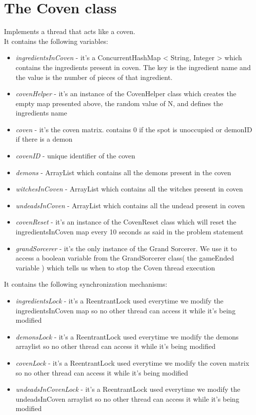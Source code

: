 \documentclass[14pt]{article}
\begin{document}
\section*{The Coven class}
\vspace{5 mm}
Implements a thread that acts like a coven.\\
It contains the following variables:\\ 
\begin{itemize}
            \item \textit{ingredientsInCoven} - it's a ConcurrentHashMap < String, Integer >  which contains the ingredients present in coven. The key is the ingredient name and the value is the number of pieces of that ingredient.
            \item \textit{covenHelper} - it's an instance of the CovenHelper class which creates the empty map presented above, the random value of N, and defines the ingredients name
            \item \textit{coven} - it's the coven matrix. contains 0 if the spot is unoccupied or demonID if there is a demon
            \item \textit{covenID} - unique identifier of the coven
            \item \textit{demons} - ArrayList which contains all the demons present in the coven
            \item \textit{witchesInCoven} - ArrayList which contains all the witches present in coven
            \item \textit{undeadsInCoven} - ArrayList which contains all the undead present in coven
            \item \textit{covenReset} - it's an instance of the CovenReset class which will reset the ingredientsInCoven map every 10 seconds as said in the problem statement
            \item \textit{grandSorcerer} - it's the only instance of the Grand Sorcerer. We use it to access a boolean variable from the GrandSorcerer class( the gameEnded variable ) which tells us when to stop the Coven thread execution
\end{itemize}
It contains the following synchronization mechanisms:\\
\begin{itemize}
            \item \textit{ingredientsLock} - it's a ReentrantLock used everytime we modify the ingredientsInCoven map so no other thread can access it while it's being modified
            \item \textit{demonsLock} - it's a ReentrantLock used everytime we modify the demons arraylist so no other thread can access it while it's being modified
            \item \textit{covenLock} - it's a ReentrantLock used everytime we modify the coven matrix so no other thread can access it while it's being modified
            \item \textit{undeadsInCovenLock} - it's a ReentrantLock used everytime we modify the undeadsInCoven arraylist so no other thread can access it while it's being modified
\end{itemize}
\end{document}

